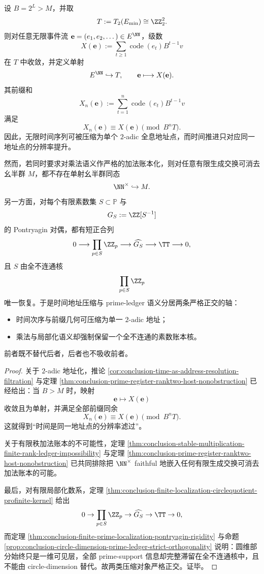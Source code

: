 \begin{theorem}\label{thm:conclusion-2adic-address-prime-ledger-orthogonal-irreducibility}
设 \(B=2^L>M\)，并取
\[
T:=T_2(E_{\min})\cong \ZZ_2^2.
\]
则对任意无限事件流 \(\mathbf e=(e_1,e_2,\dots)\in E^{\NN}\)，级数
\[
X(\mathbf e):=\sum_{t\ge 1}\operatorname{code}(e_t)B^{t-1}v
\]
在 \(T\) 中收敛，并定义单射
\[
E^{\NN}\hookrightarrow T,
\qquad
\mathbf e\longmapsto X(\mathbf e).
\]
其前缀和
\[
X_n(\mathbf e):=\sum_{t=1}^{n}\operatorname{code}(e_t)B^{t-1}v
\]
满足
\[
X_n(\mathbf e)\equiv X(\mathbf e)\pmod{B^nT}.
\]
因此，无限时间序列可被压缩为单个 \(2\)-adic 全息地址点，而时间推进只对应同一地址点的分辨率提升。

然而，若同时要求对乘法语义作严格的加法账本化，则对任意有限生成交换可消去幺半群 \(M\)，都不存在单射幺半群同态
\[
\NN^\times\hookrightarrow M.
\]
另一方面，对每个有限素数集 \(S\subset \mathbb P\) 与
\[
G_S:=\ZZ[S^{-1}]
\]
的 Pontryagin 对偶，都有短正合列
\[
0\longrightarrow \prod_{p\in S}\ZZ_p
\longrightarrow \widehat{G_S}
\longrightarrow \TT
\longrightarrow 0,
\]
且 \(S\) 由全不连通核
\[
\prod_{p\in S}\ZZ_p
\]
唯一恢复。于是时间地址压缩与 prime-ledger 语义分居两条严格正交的轴：
\begin{itemize}
  \item 时间次序与前缀几何可压缩为单一 \(2\)-adic 地址；
  \item 乘法与局部化语义却强制保留一个全不连通的素数账本核。
\end{itemize}
前者既不替代后者，后者也不吸收前者。
\end{theorem}
\begin{proof}
关于 \(2\)-adic 地址化，推论 \ref{cor:conclusion-time-as-address-resolution-filtration} 与定理 \ref{thm:conclusion-prime-register-ranktwo-host-nonobstruction} 已经给出：当 \(B>M\) 时，映射
\[
\mathbf e\mapsto X(\mathbf e)
\]
收敛且为单射，并满足全部前缀同余
\[
X_n(\mathbf e)\equiv X(\mathbf e)\pmod{B^nT}.
\]
这就得到“时间是同一地址点的分辨率滤过”。

关于有限秩加法账本的不可能性，定理 \ref{thm:conclusion-stable-multiplication-finite-rank-ledger-impossibility} 与定理 \ref{thm:conclusion-prime-register-ranktwo-host-nonobstruction} 已共同排除把 \(\NN^\times\) faithful 地嵌入任何有限生成交换可消去加法账本的可能。

最后，对有限局部化数系，定理 \ref{thm:conclusion-finite-localization-circlequotient-profinite-kernel} 给出
\[
0\to \prod_{p\in S}\ZZ_p\to \widehat{G_S}\to \TT\to 0,
\]
而定理 \ref{thm:conclusion-finite-prime-localization-pontryagin-rigidity} 与命题 \ref{prop:conclusion-circle-dimension-prime-ledger-strict-orthogonality} 说明：圆维部分始终只是一维可见层，全部 prime-support 信息却完整滞留在全不连通核中，且不能由 circle-dimension 替代。故两类压缩对象严格正交。证毕。
\end{proof}

